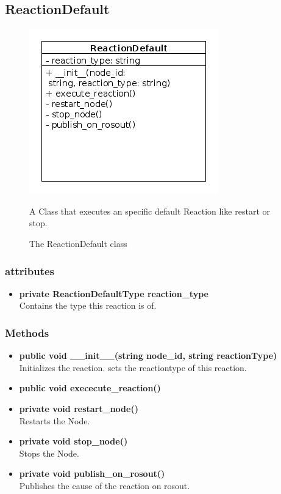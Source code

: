 \newpage
\subsection{ReactionDefault}
\begin{figure}[htbp]
	\begin{minipage}[t]{8cm}
		\vspace{0pt}
		\centering
		\includegraphics[scale=0.6]{./diagram_pictures/reactor/ReactionDefault.png}
		\caption{The ReactionDefault class}
	\end{minipage}
	\hfill
	\begin{minipage}[t]{8cm}
		\vspace{10pt}
			A Class that executes an specific default Reaction like restart or stop.
	\end{minipage}
\end{figure}  

\subsubsection{attributes}
\begin{itemize}
	\item \textbf{ private ReactionDefaultType reaction\_type}\\
		Contains the type this reaction is of.
\end{itemize}
\subsubsection{Methods}
\begin{itemize}
	\item \textbf{ public void \_\_init\_\_(string node\_id, string reactionType) }\\
		Initializes the reaction. sets the reactiontype of this reaction.
	\item \textbf{ public void exececute\_reaction() }\\
	\item \textbf{ private void restart\_node() }\\
		Restarts the Node.
	\item \textbf{ private void stop\_node() }\\
		Stops the Node.
	\item \textbf{ private void publish\_on\_rosout() }\\
		Publishes the cause of the reaction on rosout.
\end{itemize}



